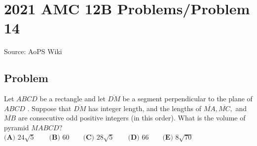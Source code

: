 \documentclass[12pt]{article}
\begin{document}
\section*{{2021 AMC 12B Problems/Problem 14}}
Source: AoPS Wiki

\subsection*{Problem}
Let $ABCD$ be a rectangle and let $\overline{DM}$ be a segment perpendicular to the plane of $ABCD$ . Suppose that $\overline{DM}$ has integer length, and the lengths of $\overline{MA},\overline{MC},$ and $\overline{MB}$ are consecutive odd positive integers (in this order). What is the volume of pyramid $MABCD?$ $\textbf{(A) }24\sqrt5 \qquad \textbf{(B) }60 \qquad \textbf{(C) }28\sqrt5\qquad \textbf{(D) }66 \qquad \textbf{(E) }8\sqrt{70}$
\end{document}
